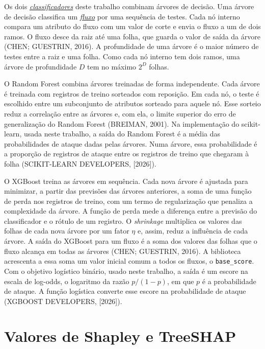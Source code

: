\documentclass[
  12pt,
  oneside,
  a4paper,
  chapter=TITLE,
  sumario=tradicional,
  english,
  brazil
]{abntex2}
\newcommand{\termo}[2]{\hyperref[gl:#1]{\emph{#2}}}
\begin{document}
Os dois \termo{classificador}{classificadores} deste trabalho combinam árvores de decisão. Uma
árvore de decisão classifica um \termo{fluxo}{fluxo} por uma sequência de testes. Cada nó interno
compara um atributo do fluxo com um valor de corte e envia o fluxo a um de dois ramos. O fluxo desce
da raiz até uma folha, que guarda o valor de saída da árvore (CHEN; GUESTRIN, 2016). A profundidade
de uma árvore é o maior número de testes entre a raiz e uma folha. Como cada nó interno tem dois
ramos, uma árvore de profundidade $D$ tem no máximo $2^D$ folhas.

O Random Forest combina árvores treinadas de forma independente. Cada árvore é treinada com
registros de treino sorteados com reposição. Em cada nó, o teste é escolhido entre um subconjunto
de atributos sorteado para aquele nó. Esse sorteio reduz a correlação entre as árvores e, com ela, o
limite superior do erro de generalização do Random Forest (BREIMAN, 2001). Na implementação do
scikit-learn, usada neste trabalho, a saída do Random Forest é a média das probabilidades de ataque
dadas pelas árvores. Numa árvore, essa probabilidade é a proporção de registros de ataque entre os
registros de treino que chegaram à folha (SCIKIT-LEARN DEVELOPERS, [2026]).

O XGBoost treina as árvores em sequência. Cada nova árvore é ajustada para minimizar, a partir das
previsões das árvores anteriores, a soma de uma função de perda nos registros de treino, com um termo
de regularização que penaliza a complexidade da árvore. A função de perda mede a diferença entre a
previsão do classificador e o rótulo de um registro. O \emph{shrinkage} multiplica os valores das
folhas de cada nova árvore por um fator $\eta$ e, assim, reduz a influência de cada árvore. A saída
do XGBoost para um fluxo é a soma dos valores das folhas que o fluxo alcança em todas as árvores
(CHEN; GUESTRIN, 2016). A biblioteca acrescenta a essa soma um valor inicial comum a todos os fluxos,
o \texttt{base\_score}. Com o objetivo logístico binário, usado neste trabalho, a saída é um escore
na escala de log-odds, o logaritmo da razão $p/(1-p)$, em que $p$ é a probabilidade de ataque. A
função logística converte esse escore na probabilidade de ataque (XGBOOST DEVELOPERS, [2026]).

\section{Valores de Shapley e TreeSHAP}
\label{sec:treeshap}
\end{document}

